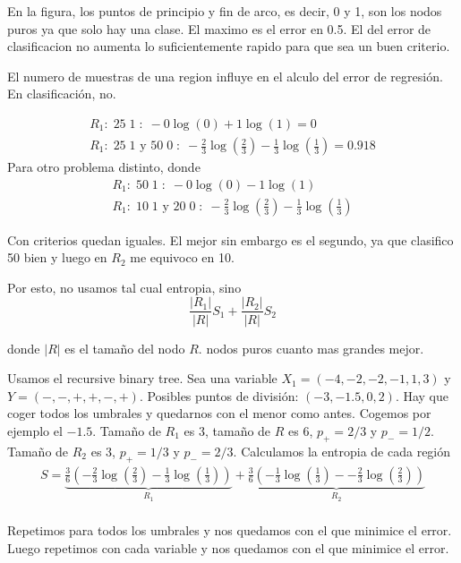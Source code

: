 En la figura, los puntos de principio y fin de arco, es decir, 0 y 1, son los nodos puros ya que solo hay una clase. El maximo es el error en 0.5. El del error de clasificacion no aumenta lo suficientemente rapido para que sea un buen criterio. 

El numero de muestras de una region influye en el alculo del error de regresión. En clasificación, no.

\begin{example}
\begin{align}
R_1: \; 25 \; 1 \; : \; -0\log(0) + 1\log(1) = 0\\
R_1: \; 25 \; 1 \text{ y } 50 \; 0 \; : \; - \frac{2}{3}\log(\frac{2}{3}) - \frac{1}{3}\log(\frac{1}{3}) = 0.918
\end{align}
Para otro problema distinto, donde 
\begin{align}
R_1: \; 50 \; 1 \; : \; -0\log(0) - 1\log(1) \\
R_1: \; 10 \; 1 \text{ y } 20 \; 0 \; : \; - \frac{2}{3}\log(\frac{2}{3}) - \frac{1}{3}\log(\frac{1}{3})
\end{align}

Con criterios quedan iguales. El mejor sin embargo es el segundo, ya que clasifico 50 bien y luego en $R_2$ me equivoco en 10.
\end{example}

Por esto, no usamos tal cual entropia, sino 
\begin{equation}
\frac{|R_1|}{|R|} S_1 + \frac{|R_2|}{|R|} S_2
\end{equation}

donde $|R|$ es el tamaño del nodo $R$. nodos puros cuanto mas grandes mejor.

\begin{example}
Usamos el recursive binary tree. Sea una variable $X_1 = (-4, -2, -2, -1, 1, 3)$ y $Y = (-, -, +, +, -, +)$. Posibles puntos de división: $(-3, -1.5, 0, 2)$. Hay que coger todos los umbrales y quedarnos con el menor como antes. Cogemos por ejemplo el $-1.5$. Tamaño de $R_1$ es 3, tamaño de $R$ es 6, $p_+ = 2/3$ y $p_-=1/2$. Tamaño de $R_2$ es 3, $p_+ = 1/3$ y $p_- = 2/3$. Calculamos la entropia de cada región
\begin{align}
S = \underbrace{\frac{3}{6}\left(-\frac{2}{3}\log(\frac{2}{3}) - \frac{1}{3}\log(\frac{1}{3})\right)}_{R_1} + \underbrace{\frac{3}{6} \left(-\frac{1}{3}\log(\frac{1}{3}) - -\frac{2}{3}\log(\frac{2}{3})\right)}_{R_2}\\
\end{align}

Repetimos para todos los umbrales y nos quedamos con el que minimice el error. Luego repetimos con cada variable y nos quedamos con el que minimice el error. 
\end{example}

